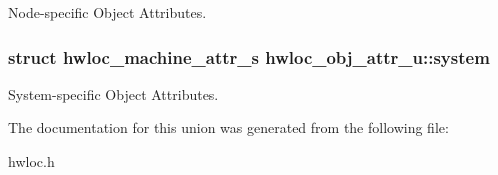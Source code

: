 Node-\/specific Object Attributes. \hypertarget{unionhwloc__obj__attr__u_aa65b98d3eada000628dc66668e4954df}{
\subsubsection[{system}]{\setlength{\rightskip}{0pt plus 5cm}struct {\bf hwloc\_\-machine\_\-attr\_\-s} {\bf hwloc\_\-obj\_\-attr\_\-u::system}}}
\label{unionhwloc__obj__attr__u_aa65b98d3eada000628dc66668e4954df}


System-\/specific Object Attributes. 

The documentation for this union was generated from the following file:\begin{DoxyCompactItemize}
\item 
hwloc.h\end{DoxyCompactItemize}
